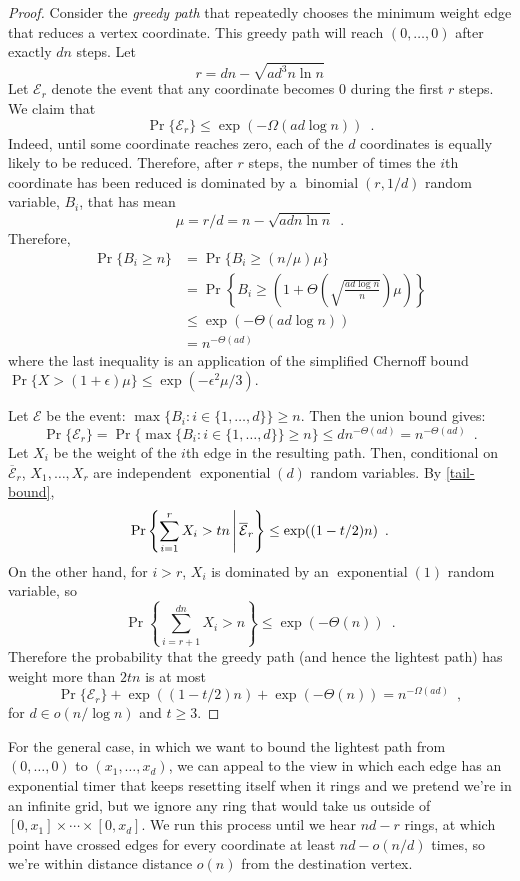 \documentclass[lotsofwhite]{patmorin}
\DeclareMathOperator{\exponential}{exponential}
\DeclareMathOperator{\binomial}{binomial}
\begin{document}
\begin{proof}
Consider the \emph{greedy path} that repeatedly chooses the minimum weight edge
that reduces a vertex coordinate.  This greedy path will reach $(0,\ldots,0)$ after exactly $dn$ steps.  Let  
\[
    r=dn-\sqrt{ad^3n\ln n}
\]
Let $\mathcal{E}_r$ denote the event that any coordinate becomes $0$
during the first $r$ steps.
We claim that
\[
    \Pr\{\mathcal{E}_r\} \le \exp(-\Omega(ad\log n)) \enspace .
\]
Indeed, until some coordinate reaches zero, each of the $d$ coordinates
is equally likely to be reduced.  Therefore, after $r$ steps, the
number of times the $i$th coordinate has been reduced is dominated by
a $\binomial(r, 1/d)$ random variable, $B_i$, that has mean 
\[
    \mu=r/d = n - \sqrt{adn\ln n} \enspace .
\]
Therefore, 
\begin{align*}
    \Pr\{B_i \ge n\} 
       & = \Pr\{B_i \ge (n/\mu)\mu\} \\
       & = \Pr\left\{B_i \ge 
           \left(1+\Theta\left(\sqrt{\frac{ad\log n}{n}}\right)\mu\right)\right\} \\
       & \le \exp(-\Theta(ad\log n)) \\
       & = n^{-\Theta(ad)} 
\end{align*}
where the last inequality is an application of the simplified Chernoff bound
$\Pr\{X>(1+\epsilon)\mu\} \le \exp(-\epsilon^2\mu/3)$. 

Let $\mathcal{E}$ be the event: $\max\{B_i:i\in\{1,\ldots,d\}\} \ge n$.  Then the union bound gives:
\[
    \Pr\{\mathcal{E}_r\}
    = \Pr\{\max\{B_i:i\in\{1,\ldots,d\}\} \ge n\} 
    \le d n^{-\Theta(ad)} = n^{-\Theta(ad)} \enspace .
\]
Let $X_i$ be the weight of the $i$th edge in the resulting path.
Then, conditional on $\overline{\mathcal{E}}_r$, $X_1,\ldots,X_r$ are
independent $\exponential(d)$ random variables. By \eqref{tail-bound},
\[
   \Pr\left\{\sum_{i=1}^r X_i > tn\,\Bigg{|}\, \overline{\mathcal{E}}_r\right\}  
        \le \exp((1-t/2)n) \enspace .
\]
On the other hand, for $i>r$, $X_i$ is dominated by an $\exponential(1)$
random variable, so
\[
   \Pr\left\{\sum_{i=r+1}^{dn} X_i > n \right\}  
      \le \exp\left(-\Theta(n)\right) \enspace .
\]
Therefore the probability that the greedy path (and hence the lightest path) has weight more than $2tn$ is at most 
\[
    \Pr\{\mathcal{E}_r\} + \exp((1-t/2)n) + \exp(-\Theta(n)) = n^{-\Omega(ad)} \enspace ,
\]
for $d\in o(n/\log n)$ and $t\ge 3$. 
\end{proof}

For the general case, in which we want to bound the lightest path from
$(0,\ldots,0)$ to $(x_1,\ldots,x_d)$, we can appeal to the view in which
each edge has an exponential timer that keeps resetting itself when it
rings and we pretend we're in an infinite grid, but we ignore any ring
that would take us outside of $[0,x_1]\times\cdots\times[0,x_d]$. We run
this process until we hear $nd-r$ rings, at which point have crossed
edges for every coordinate at least $nd-o(n/d)$ times, so we're within
distance distance $o(n)$ from the destination vertex.  
\end{document}

